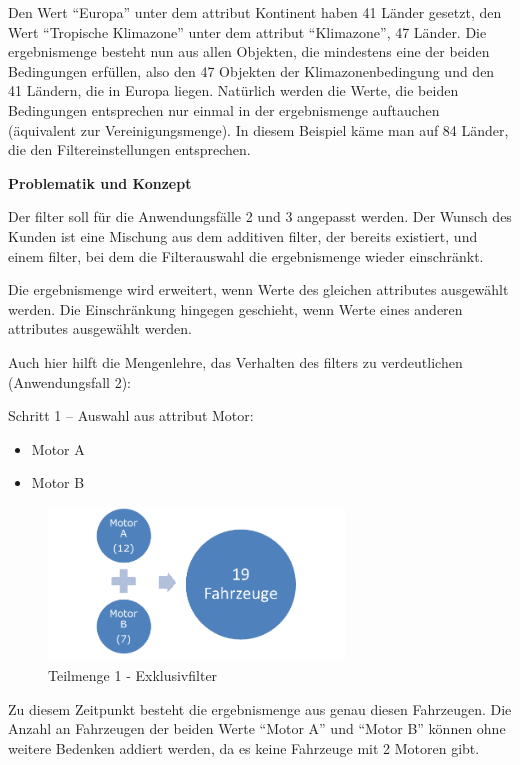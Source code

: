 Den Wert \enquote{Europa} unter dem \gls{attribut} Kontinent haben 41 Länder gesetzt, den Wert \enquote{Tropische Klimazone} unter dem \gls{attribut} \enquote{Klimazone}, 47 Länder. Die \gls{ergebnismenge} besteht nun aus allen Objekten, die mindestens eine der beiden Bedingungen erfüllen, also den 47 Objekten der Klimazonenbedingung und den 41 Ländern, die in Europa liegen. Natürlich werden die Werte, die beiden Bedingungen entsprechen nur einmal in der \gls{ergebnismenge} auftauchen (äquivalent zur Vereinigungsmenge). In diesem Beispiel käme man auf 84 Länder, die den Filtereinstellungen entsprechen.

\textbf{Problematik und Konzept}

Der \gls{filter} soll für die Anwendungsfälle 2 und 3 angepasst werden. Der Wunsch des Kunden ist eine Mischung aus dem additiven \gls{filter}, der bereits existiert, und einem \gls{filter}, bei dem die Filterauswahl die \gls{ergebnismenge} wieder einschränkt.

Die \gls{ergebnismenge} wird erweitert, wenn Werte des gleichen \gls{attribut}es ausgewählt werden. Die Einschränkung hingegen geschieht, wenn Werte eines anderen \gls{attribut}es ausgewählt werden.

Auch hier hilft die Mengenlehre, das Verhalten des \gls{filter}s zu verdeutlichen (Anwendungsfall 2):

Schritt 1 – Auswahl aus \gls{attribut} Motor:
\begin{itemize}
	\item Motor A
	\item Motor B
\end{itemize}

\begin{figure}[H]
 \centering
 \includegraphics[width=0.7\textwidth]{grafiken/Filter_Motor.png}
 \caption{Teilmenge 1 - Exklusivfilter}
 \label{fig:filter2}
\end{figure}

Zu diesem Zeitpunkt besteht die \gls{ergebnismenge} aus genau diesen Fahrzeugen. Die Anzahl an Fahrzeugen der beiden Werte \enquote{Motor A} und \enquote{Motor B} können ohne weitere Bedenken addiert werden, da es keine Fahrzeuge mit 2 Motoren gibt.

